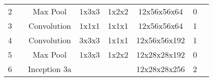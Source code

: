 \documentclass{bmvc2k}
\begin{document}
\begin{table*}[t]
\begin{tabular}{c|c|c|c|c|c|c|c}
2                                       &                                                                               & Max Pool                                                             & 1x3x3                                                                        & 1x2x2                                                                   & 12x56x56x64                                                                   & 0                      &                                                                                  \\ \cline{3-8}
3                                       &                                                                               & Convolution                                                          & 1x1x1                                                                        & 1x1x1                                                                   & 12x56x56x64                                                                   & 1                      &                                                                                  \\ \cline{3-8}
4                                       &                                                                               & Convolution                                                          & 3x3x3                                                                        & 1x1x1                                                                   & 12x56x56x192                                                                  & 1                      &                                                                                  \\ \cline{3-8}
5                                       &                                                                               & Max Pool                                                             & 1x3x3                                                                        & 1x2x2                                                                   & 12x28x28x192                                                                  & 0                      &                                                                                  \\ \cline{3-8}
6                                       &                                                                               & Inception 3a                                                         &                                                                              &                                                                         & 12x28x28x256                                                                  & 2                      &                                                                                  \\ \cline{3-8}

\end{tabular}
\end{table*}
\end{document}
